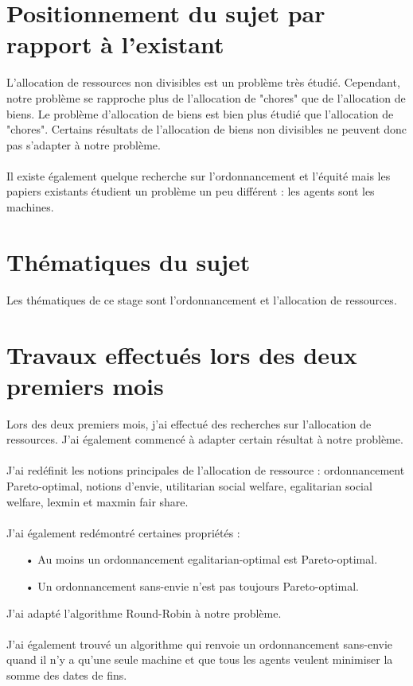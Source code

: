 \documentclass[12pt]{article}
\theoremstyle{definition}
\begin{document}
\section{Positionnement du sujet par rapport à l'existant}
\noindent
L'allocation de ressources non divisibles est un problème très étudié. Cependant, notre problème se rapproche plus de l'allocation de "chores" que de l'allocation de biens. Le problème d'allocation de biens est bien plus étudié que l'allocation de "chores". Certains résultats de l'allocation de biens non divisibles ne peuvent donc pas s'adapter à notre problème.\\\\
Il existe également quelque recherche sur l'ordonnancement et l'équité mais les papiers existants étudient un problème un peu différent : les agents sont les machines.

\section{Thématiques du sujet}
\noindent
Les thématiques de ce stage sont l'ordonnancement et l'allocation de ressources.

\section{Travaux effectués lors des deux premiers mois}
\noindent
Lors des deux premiers mois, j'ai effectué des recherches sur l'allocation de ressources. J'ai également commencé à adapter certain résultat à notre problème. \\\\
J'ai redéfinit les notions principales de l'allocation de ressource : ordonnancement Pareto-optimal, notions d'envie, utilitarian social welfare, egalitarian social welfare, lexmin et maxmin fair share.\\\\
J'ai également redémontré certaines propriétés :
\begin{itemize}
\item[•] Au moins un ordonnancement egalitarian-optimal est Pareto-optimal.
\item[•] Un ordonnancement sans-envie n'est pas toujours Pareto-optimal.
\end{itemize}
J'ai adapté l'algorithme Round-Robin à notre problème.\\\\
J'ai également trouvé un algorithme qui renvoie un ordonnancement sans-envie quand il n'y a qu'une seule machine et que tous les agents veulent minimiser la somme des dates de fins.
\end{document}
